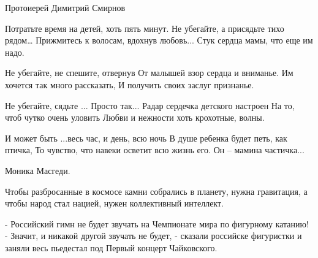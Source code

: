 Протоиерей Димитрий Смирнов

Потратьте время на детей, хоть пять минут. 
Не убегайте, а присядьте тихо рядом… 
Прижмитесь к волосам, вдохнув любовь... 
Стук сердца мамы, что еще им надо. 

Не убегайте, не спешите, отвернув 
От малышей взор сердца и вниманье. 
Им хочется так много рассказать, 
И получить своих заслуг признанье. 

Не убегайте, сядьте ... Просто так... 
Радар сердечка детского настроен 
На то, чтоб чутко очень уловить 
Любви и нежности хоть крохотные, волны. 

И может быть ...весь час, и день, всю ночь 
В душе ребенка будет петь, как птичка, 
То чувство, что навеки осветит всю жизнь его. 
Он – мамина частичка... 

Моника Масгеди.

Чтобы разбросанные в космосе камни собрались в планету, нужна гравитация, а
чтобы народ стал нацией, нужен коллективный интеллект. 

- Российский гимн не будет звучать на Чемпионате мира по фигурному катанию!
- Значит, и никакой другой звучать не будет, - сказали российске фигуристки и заняли весь пьедестал под Первый концерт Чайковского.
